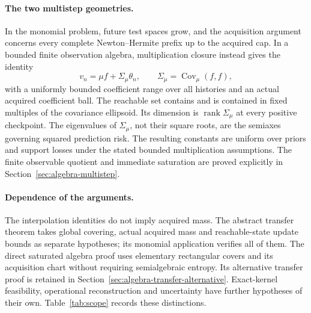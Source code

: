 \paragraph{The two multistep geometries.}
In the monomial problem, future test spaces grow, and the acquisition
argument concerns every complete Newton--Hermite prefix up to the
acquired cap. In a bounded finite observation algebra, multiplication
closure instead gives the identity
\[
 v_n=\mu f+\Sigma_\mu\theta_n,
 \qquad \Sigma_\mu=\operatorname{Cov}_\mu(f,f),
\]
with a uniformly bounded coefficient range over all histories and an
actual acquired coefficient ball. The reachable set contains and is
contained in fixed multiples of the covariance ellipsoid. Its dimension
is $\operatorname{rank}\Sigma_\mu$ at every positive checkpoint.
The eigenvalues of $\Sigma_\mu$, not their square roots, are the
semiaxes governing squared prediction risk. The resulting constants
are uniform over priors and support losses under the stated bounded
multiplication assumptions. The finite observable quotient and
immediate saturation are proved explicitly in
Section~\ref{sec:algebra-multistep}.

\paragraph{Dependence of the arguments.}
The interpolation identities do not imply acquired mass. The abstract
transfer theorem takes global covering, actual acquired mass and
reachable-state update bounds as separate hypotheses; its monomial
application verifies all of them. The direct saturated algebra proof
uses elementary rectangular covers and its acquisition chart without
requiring semialgebraic entropy. Its alternative transfer proof is
retained in Section~\ref{sec:algebra-transfer-alternative}.
Exact-kernel feasibility, operational reconstruction and uncertainty
have further hypotheses of their own. Table~\ref{tab:scope} records
these distinctions.

